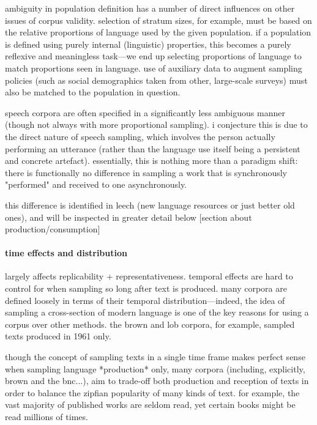 ambiguity in population definition has a number of direct influences on other issues of corpus validity.  selection of stratum sizes, for example, must be based on the relative proportions of language used by the given population.  if a population is defined using purely internal (linguistic) properties, this becomes a purely reflexive and meaningless task---we end up selecting proportions of language to match proportions seen in language.  use of auxiliary data to augment sampling policies (such as social demographics taken from other, large-scale surveys) must also be matched to the population in question.


speech corpora are often specified in a significantly less ambiguous manner (though not always with more proportional sampling).  i conjecture this is due to the direct nature of speech sampling, which involves the person actually performing an utterance (rather than the language use itself being a persistent and concrete artefact).  essentially, this is nothing more than a paradigm shift: there is functionally no difference in sampling a work that is synchronously "performed" and received to one asynchronously.

this difference is identified in leech (new language resources or just better old ones), and will be inspected in greater detail below [section about production/consumption]









\paragraph{ time effects and distribution }
largely affects replicability + representativeness.  temporal effects are hard to control for when sampling so long after text is produced. 
many corpora are defined loosely in terms of their temporal distribution---indeed, the idea of sampling a cross-section of modern language is one of the key reasons for using a corpus over other methods.  the brown and lob corpora, for example, sampled texts produced in 1961 only.

though the concept of sampling texts in a single time frame makes perfect sense when sampling language *production* only, many corpora (including, explicitly, brown and the bnc...), aim to trade-off both production and reception of texts in order to balance the zipfian popularity of many kinds of text.  for example, the vast majority of published works are seldom read, yet certain books might be read millions of times.

